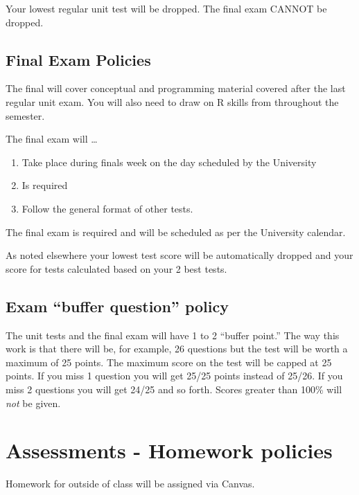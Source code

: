 \documentclass[
]{book}
\providecommand{\tightlist}{%
  \setlength{\itemsep}{0pt}\setlength{\parskip}{0pt}}
\begin{document}
Your lowest regular unit test will be dropped. The final exam CANNOT be dropped.

\hypertarget{final-exam-policies}{%
\section{Final Exam Policies}\label{final-exam-policies}}

The final will cover conceptual and programming material covered after the last regular unit exam. You will also need to draw on R skills from throughout the semester.

The final exam will \ldots{}

\begin{enumerate}
\def\labelenumi{\arabic{enumi}.}
\tightlist
\item
  Take place during finals week on the day scheduled by the University
\item
  Is required
\item
  Follow the general format of other tests.
\end{enumerate}

The final exam is required and will be scheduled as per the University calendar.

As noted elsewhere your lowest test score will be automatically dropped and your score for tests calculated based on your 2 best tests.

\hypertarget{exam-buffer-question-policy}{%
\section{Exam ``buffer question'' policy}\label{exam-buffer-question-policy}}

The unit tests and the final exam will have 1 to 2 ``buffer point.'' The way this work is that there will be, for example, 26 questions but the test will be worth a maximum of 25 points. The maximum score on the test will be capped at 25 points. If you miss 1 question you will get 25/25 points instead of 25/26. If you miss 2 questions you will get 24/25 and so forth. Scores greater than 100\% will \emph{not} be given.

\hypertarget{homework}{%
\chapter{Assessments - Homework policies}\label{homework}}

Homework for outside of class will be assigned via Canvas.
\end{document}
